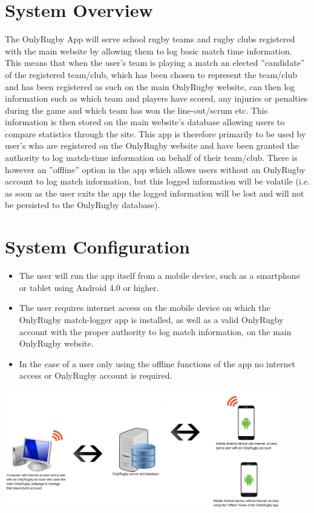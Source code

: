 \documentclass[hidelinks,a4paper,12pt]{article}
\begin{document}
\newpage
\section{System Overview} 
The OnlyRugby App will serve school rugby teams and rugby clubs registered with the main website by allowing them to log basic match time information. This means that when the user's team is playing a match an elected ''candidate'' of the registered team/club, which has been chosen to represent the team/club and has been registered as such on the main OnlyRugby website, can then log information such as which team and players have scored, any injuries or penalties during the game and which team has won the line-out/scrum etc. This information is then stored on the main website's database allowing users to compare statistics through the site. This app is therefore primarily to be used by user's who are registered on the OnlyRugby website and have been granted the authority to log match-time information on behalf of their team/club. There is however an ''offline'' option in the app which allows users without an OnlyRugby account to log match information, but this logged information will be volatile (i.e. as soon as the user exits the app the logged information will be lost and will not be persisted to the OnlyRugby database).

\section{System Configuration}
\begin {itemize}
	\item The user will run the app itself from a mobile device, such as a smartphone or tablet using Android 4.0 or higher.
	\item The user requires internet access on the mobile device on which the OnlyRugby match-logger app is installed, as well as a valid OnlyRugby account with the proper authority to log match information, on the main OnlyRugby website.
	\item In the case of a user only using the offline functions of the app no internet access or OnlyRugby account is required.
\end{itemize}
\begin{center}
  	 \includegraphics[width=0.9\textwidth] {./images/SystemConfiguration2.png}\\[0.4cm]
\end{center}
\end{document}
